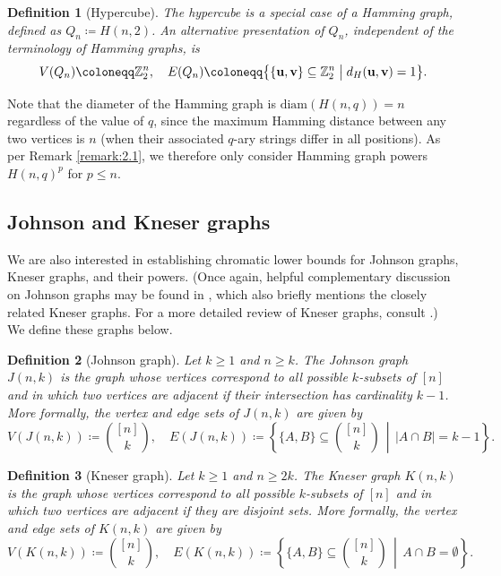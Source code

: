 \documentclass{article}
\def\Z{\mathbb{Z}}
\def\u{\mathbf{u}}
\def\vv{\mathbf{v}} %
\numberwithin{equation}{section}
\theoremstyle{plain}
\newtheorem{definition}{Definition}
\begin{document}
\begin{definition}[Hypercube]\label{defn:4}
    The \emph{hypercube} is a special case of a Hamming graph, defined as $Q_n \coloneqq H(n, 2)$. An alternative presentation of $Q_n$, independent of the terminology of Hamming graphs, is
    \[V(Q_n) \coloneqq \Z_2^n, \quad E(Q_n) \coloneqq \bigl\{\{\u, \vv\} \subseteq \Z_2^n \bigm| d_H(\u, \vv) = 1\bigr\}.\]
\end{definition}

Note that the diameter of the Hamming graph is $\mathrm{diam}(H(n, q)) = n$ regardless of the value of $q$, since the maximum Hamming distance between any two vertices is $n$ (when their associated $q$-ary strings differ in all positions). As per Remark \ref{remark:2.1}, we therefore only consider Hamming graph powers $H(n, q)^p$ for $p \le n$.

\subsection{Johnson and Kneser graphs}\label{subsection:2.2}

We are also interested in establishing chromatic lower bounds for Johnson graphs, Kneser graphs, and their powers. (Once again, helpful complementary discussion on Johnson graphs may be found in \cite[pp. 255--261]{BCN89}, which also briefly mentions the closely related Kneser graphs. For a more detailed review of Kneser graphs, consult \cite[p. 22]{HIK11}.) We define these graphs below.

\begin{definition}[Johnson graph]\label{defn:5}
    Let $k \ge 1$ and $n \ge k$. The \emph{Johnson graph} $J(n, k)$ is the graph whose vertices correspond to all possible $k$-subsets of $[n]$ and in which two vertices are adjacent if their intersection has cardinality $k - 1$. More formally, the vertex and edge sets of $J(n, k)$ are given by
    \[V(J(n, k)) \coloneqq \binom{[n]}{k}, \quad E(J(n, k)) \coloneqq \left\{\{A, B\} \subseteq \binom{[n]}{k}\, \middle|\, \lvert A \cap B \rvert = k - 1\right\}.\]
\end{definition}

\begin{definition}[Kneser graph]\label{defn:6}
    Let $k \ge 1$ and $n \ge 2k$. The \emph{Kneser graph} $K(n, k)$ is the graph whose vertices correspond to all possible $k$-subsets of $[n]$ and in which two vertices are adjacent if they are disjoint sets. More formally, the vertex and edge sets of $K(n, k)$ are given by
    \[V(K(n, k)) \coloneqq \binom{[n]}{k}, \quad E(K(n, k)) \coloneqq \left\{\{A, B\} \subseteq \binom{[n]}{k}\, \middle|\, A \cap B = \emptyset\right\}.\]
\end{definition}
\end{document}
